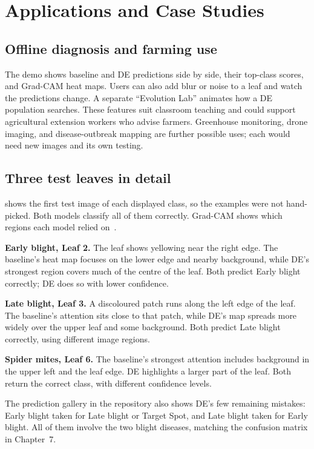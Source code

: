 \chapter{Applications and Case Studies}
\section{Offline diagnosis and farming use}
The demo shows baseline and DE predictions side by side, their top-class scores, and Grad-CAM heat maps. Users can also add blur or noise to a leaf and watch the predictions change. A separate ``Evolution Lab'' animates how a DE population searches. These features suit classroom teaching and could support agricultural extension workers who advise farmers. Greenhouse monitoring, drone imaging, and disease-outbreak mapping are further possible uses; each would need new images and its own testing.

\section{Three test leaves in detail}
 shows the first test image of each displayed class, so the examples were not hand-picked. Both models classify all of them correctly. Grad-CAM shows which regions each model relied on~\cite{selvaraju2017gradcam}.

\textbf{Early blight, Leaf 2.} The leaf shows yellowing near the right edge. The baseline's heat map focuses on the lower edge and nearby background, while DE's strongest region covers much of the centre of the leaf. Both predict Early blight correctly; DE does so with lower confidence.

\textbf{Late blight, Leaf 3.} A discoloured patch runs along the left edge of the leaf. The baseline's attention sits close to that patch, while DE's map spreads more widely over the upper leaf and some background. Both predict Late blight correctly, using different image regions.

\textbf{Spider mites, Leaf 6.} The baseline's strongest attention includes background in the upper left and the leaf edge. DE highlights a larger part of the leaf. Both return the correct class, with different confidence levels.

The prediction gallery in the repository also shows DE's few remaining mistakes: Early blight taken for Late blight or Target Spot, and Late blight taken for Early blight. All of them involve the two blight diseases, matching the confusion matrix in Chapter~7.

